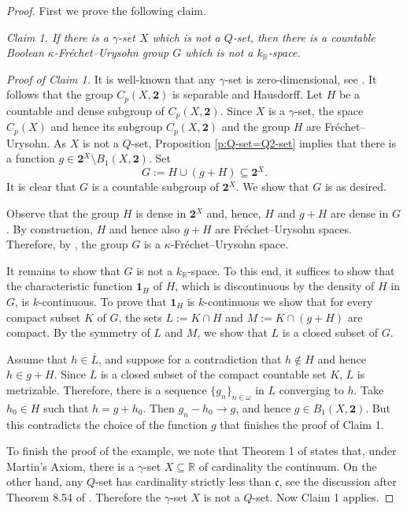 \documentclass[preprint,11pt]{elsarticle}
\theoremstyle{definition}
\theoremstyle{remark}
\numberwithin{equation}{section}
\numberwithin{theorem}{section}
\newcommand{\w}{\omega}
\newcommand{\IR}{\mathbb{R}}
\newcommand{\SM}{{\setminus}}
\begin{document}
\begin{proof}
First we prove  the following claim.
\smallskip

{\em Claim 1. If there is a $\gamma$-set $X$ which is not a $Q$-set, then there is a countable Boolean  $\kappa$-Fr\'{e}chet--Urysohn group $G$ which is not a $k_\IR$-space.}
\smallskip

{\em Proof of Claim 1.} It is well-known that any $\gamma$-set is zero-dimensional, see \cite[Corollary]{GN}. It follows that the group $C_p(X,\mathbf{2})$ is separable and Hausdorff. Let $H$ be a countable and dense  subgroup of $C_p(X,\mathbf{2})$. Since $X$ is a $\gamma$-set, the space $C_p(X)$ and hence its subgroup $C_p(X,\mathbf{2})$ and the group $H$ are Fr\'{e}chet--Urysohn. As $X$  is not a $Q$-set, Proposition \ref{p:Q-set=Q2-set} implies that there is a function $g\in\mathbf{2}^X\SM B_1(X,\mathbf{2})$. Set
\[
G:=H\cup(g+H) \subseteq \mathbf{2}^X.
\]
It is clear that $G$ is a countable subgroup of $\mathbf{2}^X$. We show that $G$ is as desired.

Observe that the group $H$ is dense in $\mathbf{2}^X$ and, hence, $H$ and $g+H$ are dense in $G$. By construction, $H$ and hence also $g+H$ are Fr\'{e}chet--Urysohn spaces. Therefore, by \cite[Theorem~2.1]{Gabr-B1}, the group $G$ is a  $\kappa$-Fr\'{e}chet--Urysohn space.

It remains to show that $G$ is not a $k_\IR$-space. To this end, it suffices to show that the characteristic function $\mathbf{1}_H$ of $H$, which is discontinuous by the density of $H$ in $G$,  is $k$-continuous. To prove that $\mathbf{1}_H$ is $k$-continuous we show that for every compact subset $K$ of $G$, the sets $L:=K\cap H$ and $M:=K\cap (g+H)$ are compact. By the symmetry of $L$ and $M$, we show that $L$ is a closed subset of $G$.

Assume that $h\in \overline{L}$, and suppose for a contradiction that $h\not\in H$ and hence $h\in g+ H$.
Since $\overline{L}$ is a closed subset of the compact countable set $K$,  $\overline{L}$ is metrizable. Therefore, there is a sequence $\{g_n\}_{n\in\w}$ in $L$ converging to $h$. Take $h_0\in H$ such that $h=g+h_0$. Then $g_n-h_0\to g$, and hence $g\in B_1(X,\mathbf{2})$. But  this contradicts the choice of the function $g$ that finishes the proof of Claim 1.
\smallskip

To finish the proof of the example, we note that Theorem 1 of \cite{Gal-Miller} states that, under Martin's Axiom, there is a $\gamma$-set $X\subseteq \IR$ of cardinality the continuum. On the other hand, any $Q$-set has cardinality strictly less than $\mathfrak{c}$, see the discussion after Theorem 8.54 of \cite[p.~314]{Bukovsky2011}. Therefore the $\gamma$-set $X$ is not a $Q$-set. Now Claim 1 applies.
\end{proof}
\end{document}
